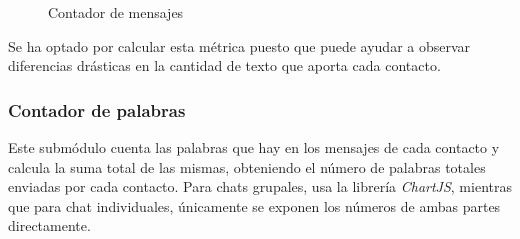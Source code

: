 \begin{figure}[H]
	\centering
	\qquad
	\caption{Contador de mensajes}
	\label{fig:chap4:message_count}
\end{figure}

Se ha optado por calcular esta métrica puesto que puede ayudar a observar diferencias drásticas en la cantidad de texto que aporta cada contacto.

\subsubsection{Contador de palabras}

Este submódulo cuenta las palabras que hay en los mensajes de cada contacto y calcula la suma total de las mismas, obteniendo el número de palabras totales enviadas por cada contacto. Para chats grupales, usa la librería \textit{ChartJS}, mientras que para chat individuales, únicamente se exponen los números de ambas partes directamente.

